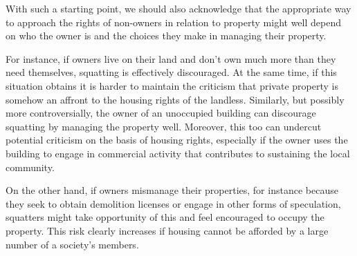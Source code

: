  With such a starting point, we should also acknowledge that the appropriate way to approach the rights of non-owners in relation to property might well depend on who the owner is and the choices they make in managing their property.

For instance, if owners live on their land and don't own much more than they need themselves,  squatting is effectively discouraged. At the same time, if this situation obtains it is harder to maintain the criticism that private property is somehow an affront to the housing rights of the landless. Similarly, but possibly more controversially, the owner of an unoccupied building can discourage squatting by managing the property well. Moreover, this too can undercut potential criticism on the basis of housing rights, especially if the owner uses the building to engage in commercial activity that contributes to sustaining the local community.

On the other hand, if owners mismanage their properties, for instance because they seek to obtain demolition licenses or engage in other forms of speculation, squatters might take opportunity of this and feel encouraged to occupy the property. This risk clearly increases if housing cannot be afforded by a large number of a society's members. 

